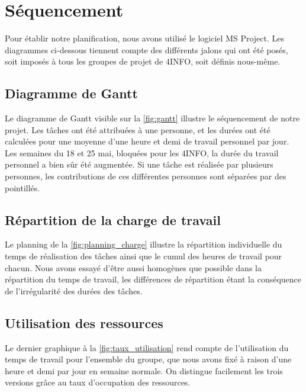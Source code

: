 \section{Séquencement}
	\label{sec:sequencement}
	Pour établir notre planification, nous avons utilisé le logiciel MS Project. Les diagrammes ci-dessous tiennent compte des différents jalons qui ont été posés, soit imposés à tous les groupes de projet de 4INFO, soit définis nous-même.

	\subsection{Diagramme de Gantt}
		Le diagramme de Gantt visible sur la \ffigure{} \ref{fig:gantt} illustre le séquencement de notre projet. Les tâches ont été attribuées à une personne, et les durées ont été calculées pour une moyenne d'une heure et demi de travail personnel par jour. Les semaines du 18 et 25 mai, bloquées pour les 4INFO, la durée du travail personnel a bien sûr été augmentée. Si une tâche est réalisée par plusieurs personnes, les contributions de ces différentes personnes sont séparées par des pointillés.  
	
	\subsection{Répartition de la charge de travail}
		Le planning de la \ffigure{} \ref{fig:planning_charge} illustre la répartition individuelle du temps de réalisation des tâches ainsi que le cumul des heures de travail pour chacun. Nous avons essayé d'être aussi homogènes que possible dans la répartition du temps de travail, les différences de répartition étant la conséquence de l'irrégularité des durées des tâches.

	\subsection{Utilisation des ressources}
		Le dernier graphique à la \ffigure{} \ref{fig:taux_utilisation} rend compte de l'utilisation du temps de travail pour l'ensemble du groupe, que nous avons fixé à raison d'une heure et demi par jour en semaine normale. On distingue facilement les trois versions grâce au taux d'occupation des ressources.  

